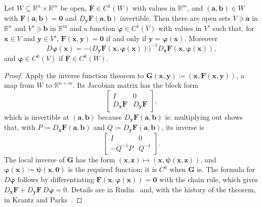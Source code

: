 \begin{theorem}
\label{thm:implicit-function}
Let $W\subseteq\mathbb R^n\times\mathbb R^m$ be open, $\mathbf F\in C^1(W)$ with values in $\mathbb R^m$, and $(\mathbf a,\mathbf b)\in W$ with $\mathbf F(\mathbf a,\mathbf b)=\mathbf0$ and $D_{\mathbf y}\mathbf F(\mathbf a,\mathbf b)$ invertible. Then there are open sets $V\ni\mathbf a$ in $\mathbb R^n$ and $V'\ni\mathbf b$ in $\mathbb R^m$ and a function $\boldsymbol\varphi\in C^1(V)$ with values in $V'$ such that, for $\mathbf x\in V$ and $\mathbf y\in V'$, $\mathbf F(\mathbf x,\mathbf y)=\mathbf0$ if and only if $\mathbf y=\boldsymbol\varphi(\mathbf x)$. Moreover
\[
D\boldsymbol\varphi(\mathbf x)=-\bigl(D_{\mathbf y}\mathbf F(\mathbf x,\boldsymbol\varphi(\mathbf x))\bigr)^{-1}D_{\mathbf x}\mathbf F(\mathbf x,\boldsymbol\varphi(\mathbf x)),
\]
and $\boldsymbol\varphi\in C^k(V)$ if $\mathbf F\in C^k(W)$.
\end{theorem}

\begin{proof}
Apply the inverse function theorem to $\mathbf G(\mathbf x,\mathbf y)\coloneqq(\mathbf x,\mathbf F(\mathbf x,\mathbf y))$, a map from $W$ to $\mathbb R^{n+m}$. Its Jacobian matrix has the block form
\[
\begin{bmatrix}I&0\\D_{\mathbf x}\mathbf F&D_{\mathbf y}\mathbf F\end{bmatrix},
\]
which is invertible at $(\mathbf a,\mathbf b)$ because $D_{\mathbf y}\mathbf F(\mathbf a,\mathbf b)$ is: multiplying out shows that, with $P\coloneqq D_{\mathbf x}\mathbf F(\mathbf a,\mathbf b)$ and $Q\coloneqq D_{\mathbf y}\mathbf F(\mathbf a,\mathbf b)$, its inverse is
\[
\begin{bmatrix}I&0\\-Q^{-1}P&Q^{-1}\end{bmatrix}.
\]
The local inverse of $\mathbf G$ has the form $(\mathbf x,\mathbf z)\mapsto(\mathbf x,\boldsymbol\psi(\mathbf x,\mathbf z))$, and $\boldsymbol\varphi(\mathbf x)\coloneqq\boldsymbol\psi(\mathbf x,\mathbf0)$ is the required function; it is $C^k$ when $\mathbf G$ is. The formula for $D\boldsymbol\varphi$ follows by differentiating $\mathbf F(\mathbf x,\boldsymbol\varphi(\mathbf x))=\mathbf0$ with the chain rule, which gives $D_{\mathbf x}\mathbf F+D_{\mathbf y}\mathbf F\,D\boldsymbol\varphi=0$. Details are in Rudin~\cite[Thm.~9.28]{rudin1976} and, with the history of the theorem, in Krantz and Parks~\cite{krantz2002ift}.
\end{proof}

